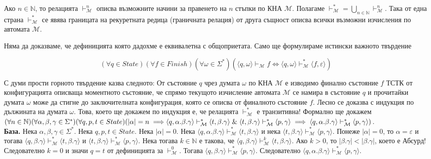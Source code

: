 \documentclass[12pt]{article}
\begin{document}
Ако \(n \in \mathbb N\), то релацията \(\vdash_{\mathcal M}^n\) описва възможните начини за правенето на \(n\) стъпки по КНА \(\mathcal M\). Полагаме \(\vdash_{\mathcal M}^* = \displaystyle\bigcup_{n \in \mathbb N} \vdash_{\mathcal M}^n\).
Така от една страна \(\vdash_{\mathcal M}^*\) се явява границата на рекуретната редица (граничната релация) от друга същност описва всички възможни изчисления по автомата \(\mathcal M\).

Няма да доказваме, че дефиницията която дадохме е еквивалетна с общоприетата. Само ще формулираме истински важното твърдение

\[(\forall q \in State)(\forall f \in Finish)(\forall \omega \in \Sigma^*)( \langle q, \omega \rangle \vdash_{\mathcal M} f \iff \langle q, \omega \rangle \vdash_{\mathcal M}^* \langle f, \varepsilon \rangle  ) \]

С думи прости горното твърдение казва следното: От състояние \(q\) чрез думата \(\omega\) по КНА \(\mathcal M\) е изводимо финално състояние \(f\) ТСТК от конфигурацията описваща моментното състояние, че спрямо текущото изчисление автомата \(\mathcal M\) се намира в състояние \(q\) и прочитайки думата \(\omega\) може да стигне до заключителната конфигурация, която се описва от финалното състояние \(f\). Лесно се доказва с индукция по дължината на думата \(\omega\). Това, което ще докажем по индукция е, че релацията \(\vdash_{\mathcal M}^*\) е транзитивна! Формално ще докажем \\

\((\forall n \in \mathbb N)(\forall \alpha, \beta, \gamma \in \Sigma^*)(\forall q, p, t \in State)( |\alpha| = n \implies \\ \langle q, \alpha.\beta.\gamma \rangle \vdash_{\mathcal M}^* \langle t, \beta.\gamma \rangle \;\&\; \langle t, \beta.\gamma \rangle \vdash_{\mathcal M}^* \langle p, \gamma \rangle \implies \langle q, \alpha.\beta.\gamma \rangle \vdash_{\mathcal M}^* \langle p, \gamma \rangle )\). \\

\textbf{База.}
Нека \(\alpha, \beta, \gamma \in \Sigma^*\). Нека \(q, p, t \in State\). Нека \(|\alpha| = 0\).
Нека \(\langle q, \alpha.\beta.\gamma \rangle \vdash_{\mathcal M}^* \langle t, \beta.\gamma \rangle\)
и нека \(\langle t, \beta.\gamma \rangle \vdash_{\mathcal M}^* \langle p, \gamma \rangle\).
Понеже \(|\alpha| = 0\), то \(\alpha = \varepsilon\) и тогава \(\langle q, \beta.\gamma \rangle \vdash_{\mathcal M}^* \langle t, \beta.\gamma \rangle\) и \(\langle t, \beta.\gamma \rangle \vdash_{\mathcal M}^* \langle p, \gamma \rangle\). Нека тогава \(k \in \mathbb N\) е такова, че
\(\langle q, \beta.\gamma \rangle \vdash_{\mathcal M}^k \langle t, \beta.\gamma \rangle\).
Ако \(k > 0\), то \(|\beta.\gamma| < |\beta.\gamma|\), което е Абсурд!
Следователно \(k = 0\) и значи \(q = t\) от дефиницията за \(\vdash_{\mathcal M}^0\).
Тогава \(\langle q, \beta.\gamma \rangle \vdash_{\mathcal M}^* \langle p, \gamma \rangle\).
Следователно \(\langle q, \alpha.\beta.\gamma \rangle \vdash_{\mathcal M}^* \langle p, \gamma \rangle\). \\
\end{document}
